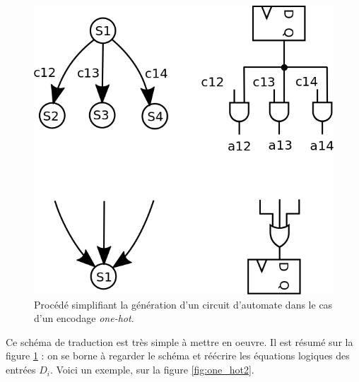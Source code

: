 \begin{figure}[!htb]
  \centering
  \includegraphics[scale=0.3]{./figures/one_hot_method.png}
  \caption{Procédé simplifiant la génération d'un circuit d'automate dans le cas d'un encodage {\it one-hot}.}
  \label{fig:one_hot}
\end{figure}

Ce schéma de traduction est très simple à mettre en oeuvre. Il est résumé sur la figure \ref{fig:one_hot} : on se borne à regarder le schéma et réécrire
les équations logiques des entrées $D_i$. Voici un exemple, sur la figure \ref{fig:one_hot2}.


